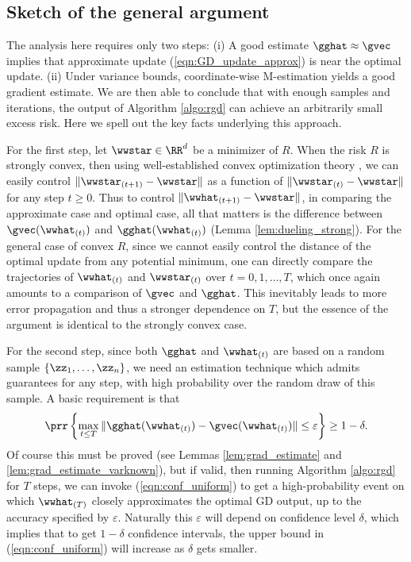 \documentclass[11pt,oneside]{article}
\theoremstyle{definition} \newtheorem{defn}{Definition}       %
\theoremstyle{plain} \newtheorem{prop}[defn]{Proposition}           %
\theoremstyle{plain} \newtheorem{thm}[defn]{Theorem}                %
\theoremstyle{plain} \newtheorem{lem}[defn]{Lemma}                  %
\theoremstyle{plain} \newtheorem{cor}[defn]{Corollary}              %
\theoremstyle{remark} \newtheorem{rmk}[defn]{Remark}                %
\theoremstyle{remark} \newtheorem{ex}[defn]{Example}                %
\begin{document}
\subsection{Sketch of the general argument}\label{sec:algo_justification}

The analysis here requires only two steps: (i) A good estimate $\gghat \approx \gvec$ implies that approximate update (\ref{eqn:GD_update_approx}) is near the optimal update. (ii) Under variance bounds, coordinate-wise M-estimation yields a good gradient estimate. We are then able to conclude that with enough samples and iterations, the output of Algorithm \ref{algo:rgd} can achieve an arbitrarily small excess risk. Here we spell out the key facts underlying this approach.

For the first step, let $\wwstar \in \RR^{d}$ be a minimizer of $R$. When the risk $R$ is strongly convex, then using well-established convex optimization theory \citep{nesterov2004ConvOpt}, we can easily control $\|\wwstar_{(t+1)}-\wwstar\|$ as a function of $\|\wwstar_{(t)}-\wwstar\|$ for any step $t \geq 0$. Thus to control $\|\wwhat_{(t+1)}-\wwstar\|$, in comparing the approximate case and optimal case, all that matters is the difference between $\gvec(\wwhat_{(t)})$ and $\gghat(\wwhat_{(t)})$ (Lemma \ref{lem:dueling_strong}). For the general case of convex $R$, since we cannot easily control the distance of the optimal update from any potential minimum, one can directly compare the trajectories of $\wwhat_{(t)}$ and $\wwstar_{(t)}$ over $t=0,1,\ldots,T$, which once again amounts to a comparison of $\gvec$ and $\gghat$. This inevitably leads to more error propagation and thus a stronger dependence on $T$, but the essence of the argument is identical to the strongly convex case.

For the second step, since both $\gghat$ and $\wwhat_{(t)}$ are based on a random sample $\{\zz_{1},\ldots,\zz_{n}\}$, we need an estimation technique which admits guarantees for any step, with high probability over the random draw of this sample. A basic requirement is that
%
\begin{align}\label{eqn:conf_uniform}
\prr\left\{ \max_{t \leq T} \|\gghat(\wwhat_{(t)})-\gvec(\wwhat_{(t)})\| \leq \varepsilon \right\} \geq 1-\delta.
\end{align}
%
Of course this must be proved (see Lemmas \ref{lem:grad_estimate} and \ref{lem:grad_estimate_varknown}), but if valid, then running Algorithm \ref{algo:rgd} for $T$ steps, we can invoke (\ref{eqn:conf_uniform}) to get a high-probability event on which $\wwhat_{(T)}$ closely approximates the optimal GD output, up to the accuracy specified by $\varepsilon$. Naturally this $\varepsilon$ will depend on confidence level $\delta$, which implies that to get $1-\delta$ confidence intervals, the upper bound in (\ref{eqn:conf_uniform}) will increase as $\delta$ gets smaller.
\end{document}
